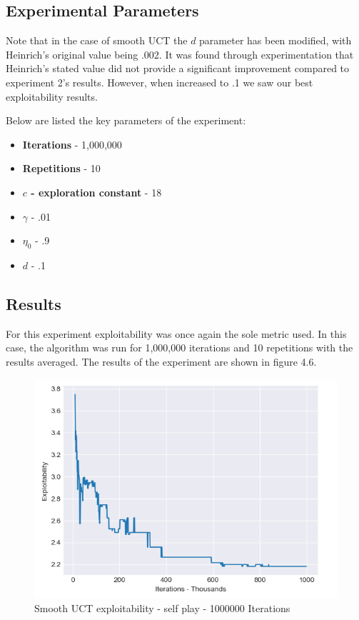 \subsection{Experimental Parameters}\label{subsec:algAndCoding3}
Note that in the case of smooth UCT the $d$ parameter has been modified, with Heinrich's
original value being .002.
It was found through experimentation that Heinrich's stated value did not provide a significant
improvement compared to experiment 2's results.
However, when increased to .1 we saw our best exploitability results.

Below are listed the key parameters of the experiment:
\begin{itemize}
    \item \textbf{Iterations} - 1,000,000
    \item \textbf{Repetitions} - 10
    \item \textbf{$c$ - exploration constant} - 18
    \item \textbf{$\gamma$} - .01
    \item \textbf{$\eta_0$} - .9
    \item \textbf{$d$} - .1
\end{itemize}

\subsection{Results}\label{subsec:results3}
For this experiment exploitability was once again the sole metric used.
In this case, the algorithm was run for 1,000,000 iterations and 10 repetitions with the results averaged.
The results of the experiment are shown in figure 4.6.
\begin{figure}[!ht]
    \includegraphics[scale=.7]{images/exploitability_self-play_stochastic_1000000.png}
    \caption{Smooth UCT exploitability - self play - 1000000 Iterations}
\end{figure}

